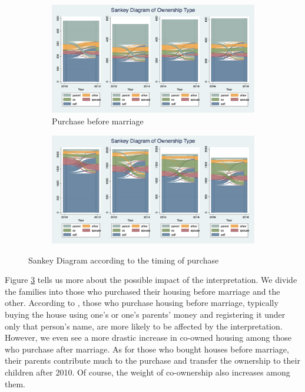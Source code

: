 \documentclass[11pt]{article}
\begin{document}
\begin{figure}
    \centering
    \begin{subfigure}[b]{0.45\textwidth}
        \centering
        \includegraphics[width=\textwidth]{graphs_new/pbeforem_sankeyall_nonpanel.png}
        \caption{Purchase before marriage}
        \label{fig:pbeforem}
        
    \end{subfigure}
    \hfill
    \begin{subfigure}[b]{0.45\textwidth}
        \centering
        \includegraphics[width=\textwidth]{graphs_new/pafterm_sankeyall_nonpanel.png}
        \label{fig:pafterm}
        
    \end{subfigure}
    \caption{Sankey Diagram according to the timing of purchase}
    \label{fig:timing}
\end{figure}

Figure \ref{fig:timing} tells us more about the possible impact of the interpretation. We divide the families into those who purchased their housing before marriage and the other. According to \citet{Huang532}, those who purchase housing before marriage, typically buying the house using one's or one's parents' money and registering it under only that person's name, are more likely to be affected by the interpretation. However, we even see a more drastic increase in co-owned housing among those who purchase after marriage. As for those who bought houses before marriage, their parents contribute much to the purchase and transfer the ownership to their children after 2010. Of course, the weight of co-ownership also increases among them.
\end{document}
